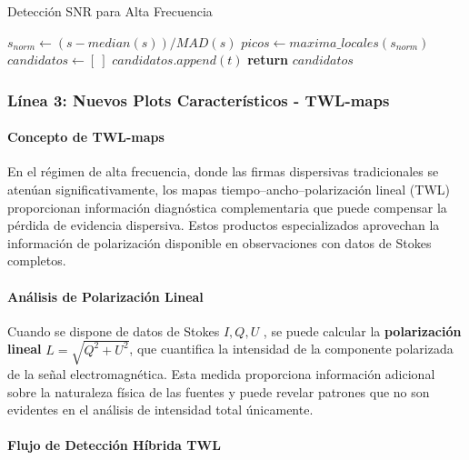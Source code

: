\begin{algorithm}[H]
\caption{Detección SNR para Alta Frecuencia}
\begin{algorithmic}[1]
    \State $s_{norm} \leftarrow (s - median(s)) / MAD(s)$
    \State $picos \leftarrow maxima\_locales(s_{norm})$
    \State $candidatos \leftarrow [\ ]$
            \State $candidatos.append(t)$
        \EndIf
    \EndFor
    \State \textbf{return} $candidatos$
\EndFunction
\end{algorithmic}
\end{algorithm}

\subsubsection{Línea 3: Nuevos Plots Característicos - TWL-maps}

\paragraph{Concepto de TWL-maps}

En el régimen de alta frecuencia, donde las firmas dispersivas tradicionales se atenúan significativamente, los mapas tiempo--ancho--polarización lineal (TWL) proporcionan información diagnóstica complementaria que puede compensar la pérdida de evidencia dispersiva. Estos productos especializados aprovechan la información de polarización disponible en observaciones con datos de Stokes completos.

\paragraph{Análisis de Polarización Lineal}

Cuando se dispone de datos de Stokes $I,Q,U$ \cite{hamaker1996understanding}, se puede calcular la \textbf{polarización lineal} $L=\sqrt{Q^2+U^2}$, que cuantifica la intensidad de la componente polarizada de la señal electromagnética. Esta medida proporciona información adicional sobre la naturaleza física de las fuentes y puede revelar patrones que no son evidentes en el análisis de intensidad total únicamente.

\paragraph{Flujo de Detección Híbrida TWL}


